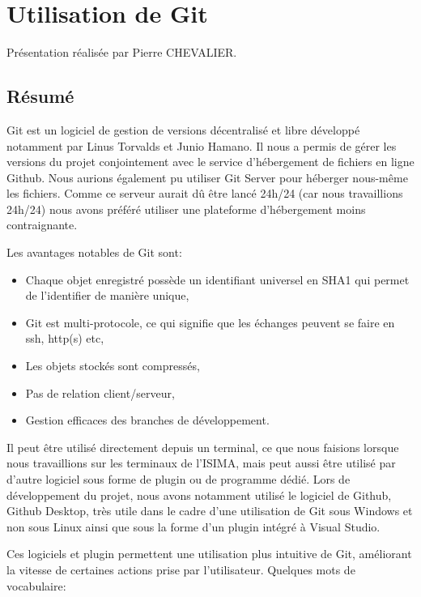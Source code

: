 \chapter{Utilisation de Git}
Présentation réalisée par Pierre CHEVALIER.
\section{Résumé}
Git est un logiciel de gestion de versions décentralisé et libre développé notamment par Linus Torvalds et Junio Hamano. Il nous a permis de gérer les versions du projet conjointement avec le service d’hébergement de fichiers en ligne Github. Nous aurions également pu utiliser Git Server pour héberger nous-même les fichiers. Comme ce serveur aurait dû être lancé 24h/24 (car nous travaillions 24h/24) nous avons préféré utiliser une plateforme d’hébergement moins contraignante.

\noindent Les avantages notables de Git sont:
\begin{itemize}
	\item Chaque objet enregistré possède un identifiant universel en SHA1 qui permet de l’identifier de manière unique,
	\item Git est multi-protocole, ce qui signifie que les échanges peuvent se faire en ssh, http(s) etc,
	\item Les objets stockés sont compressés,
	\item Pas de relation client/serveur,
	\item Gestion efficaces des branches de développement.
\end{itemize}

Il peut être utilisé directement depuis un terminal, ce que nous faisions lorsque nous travaillions sur les terminaux de l’ISIMA, mais peut aussi être utilisé par d’autre logiciel  sous forme de plugin ou de programme dédié. Lors de développement du projet, nous avons notamment utilisé le logiciel de Github, Github Desktop, très utile dans le cadre d’une utilisation de Git sous Windows et non sous Linux ainsi que sous la forme d’un plugin intégré à Visual Studio.

Ces logiciels et plugin permettent une utilisation plus intuitive de Git, améliorant la vitesse de certaines actions prise par l’utilisateur.
\newpage
\noindent Quelques mots de vocabulaire:

